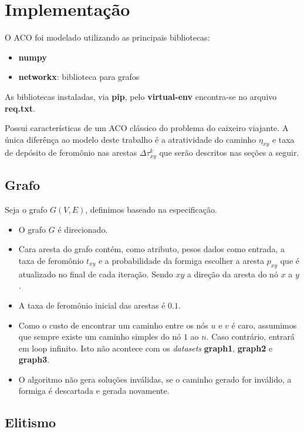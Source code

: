 \section{Implementação}

O ACO foi modelado utilizando as principais bibliotecas:

\begin{itemize}
	\item \textbf{numpy}
	\item \textbf{networkx}: biblioteca para grafos
\end{itemize}

As bibliotecas instaladas, via \textbf{pip}, pelo \textbf{virtual-env} encontra-se
no arquivo \textbf{req.txt}.

Possui características de um ACO clássico do problema do caixeiro viajante.
A única diferênça ao modelo deste trabalho é a atratividade do caminho $\eta_{xy}$
e taxa de depósito de feromônio nas arestas $\Delta\tau_{xy}^k$ que serão
descritos nas seções a seguir. 

\subsection{Grafo}

Seja o grafo $G(V, E)$, definimos baseado na especificação.

\begin{itemize}
	\item O grafo $G$ é direcionado.
	\item Cara aresta do grafo contém, como atributo, pesos dados como entrada, a taxa de feromônio $t_{xy}$ e a probabilidade
	da formiga escolher a aresta $p_{xy}$ que é atualizado no final de cada iteração.  
    Sendo $xy$ a direção da aresta do nó $x$ a $y$.
    \item A taxa de feromônio inicial das arestas é $0.1$.
	\item Como o custo de encontrar um caminho entre os nós $u$ e $v$ é caro, assumimos que sempre existe um caminho simples do nó $1$ ao $n$.
    Caso contrário,
    entrará em loop infinito. Isto não acontece com os \textit{datasets} \textbf{graph1}, \textbf{graph2} e \textbf{graph3}.
    \item O algoritmo não gera soluções inválidas, se o caminho gerado for inválido, a formiga é descartada e gerada novamente.
\end{itemize}

\subsection{Elitismo}


